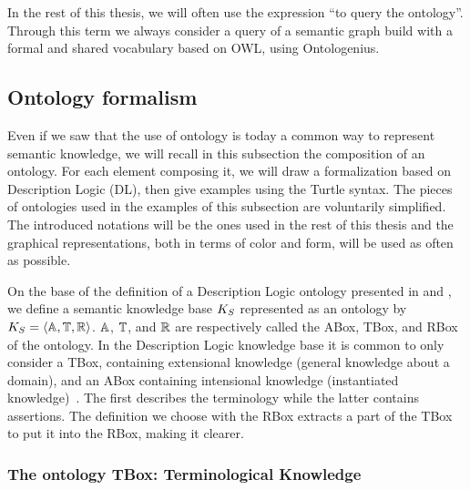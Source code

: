 In the rest of this thesis, we will often use the expression ``to query the ontology''. Through this term we always consider a query of a semantic graph build with a formal and shared vocabulary based on OWL, using Ontologenius.

\subsection{Ontology formalism}
\label{sec:kb_formalism}

Even if we saw that the use of ontology is today a common way to represent semantic knowledge, we will recall in this subsection the composition of an ontology. For each element composing it, we will draw a formalization based on Description Logic (DL), then give examples using the Turtle syntax. The pieces of ontologies used in the examples of this subsection are voluntarily simplified. The introduced notations will be the ones used in the rest of this thesis and the graphical representations, both in terms of color and form, will be used as often as possible.

On the base of the definition of a Description Logic ontology presented in \cite{fokoue_2006_summary} and \cite{krotzsch_2013_description}, we define a semantic knowledge base $K_S$ represented as an ontology by  $K_S = \langle \mathbb{A}, \mathbb{T}, \mathbb{R} \rangle$. $\mathbb{A}$, $\mathbb{T}$, and $\mathbb{R}$ are respectively called the ABox, TBox, and RBox of the ontology. In the Description Logic knowledge base it is common to only consider a TBox, containing extensional knowledge (general knowledge about a domain), and an ABox containing intensional knowledge (instantiated knowledge)~\cite{baader_2003_description}. The first describes the terminology while the latter contains assertions. The definition we choose with the RBox extracts a part of the TBox to put it into the RBox, making it clearer.

\subsubsection{The ontology TBox: Terminological Knowledge}

